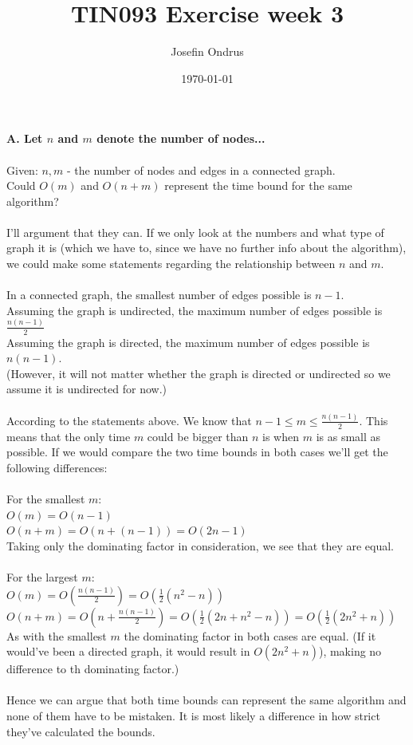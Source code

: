 \documentclass[12pt,oneside,reqno]{amsart}
\begin{document}
\setlength{\parindent}{6pt}
\def\code#1{\texttt{#1}} %

\title{TIN093 Exercise week 3}
\author{Josefin Ondrus}
\date{\today}
\maketitle

\textbf{A. Let $n$ and $m$ denote the number of nodes...}\\\\
Given: $n,m$ - the number of nodes and edges in a connected graph.\\
Could $O(m)$ and $O(n+m)$ represent the time bound for the same algorithm?\\\\
I'll argument that they can. If we only look at the numbers and what type of graph it is (which we have to, since we have no further info about the algorithm), we could make some statements regarding the relationship between $n$ and $m$.\\\\
In a connected graph, the smallest number of edges possible is $n-1$.\\
Assuming the graph is undirected, the maximum number of edges possible is $\frac{n(n-1)}{2}$\\
Assuming the graph is directed, the maximum number of edges possible is $n(n-1)$.\\
(However, it will not matter whether the graph is directed or undirected so we assume it is undirected for now.)\\\\
According to the statements above. We know that $n-1 \leq m \leq \frac{n(n-1)}{2}$. This means that the only time $m$ could be bigger than $n$ is when $m$ is as small as possible. If we would compare the two time bounds in both cases we'll get the following differences:\\\\
For the smallest $m$:\\
$O(m)=O(n-1)$\\
$O(n+m)=O(n+(n-1))=O(2n-1)$\\
Taking only the dominating factor in consideration, we see that they are equal.\\\\
For the largest $m$:\\
$O(m)=O(\frac{n(n-1)}{2})=O(\frac{1}{2}(n^2-n))$\\
$O(n+m)=O(n+\frac{n(n-1)}{2})=O(\frac{1}{2}(2n+n^2-n))=O(\frac{1}{2}(2n^2+n))$\\ 
As with the smallest $m$ the dominating factor in both cases are equal. (If it would've been a directed graph, it would result in $O(2n^2+n)$), making no difference to th dominating factor.)\\\\
Hence we can argue that both time bounds can represent the same algorithm and none of them have to be mistaken. It is most likely a difference in how strict they've calculated the bounds. 
\end{document}
